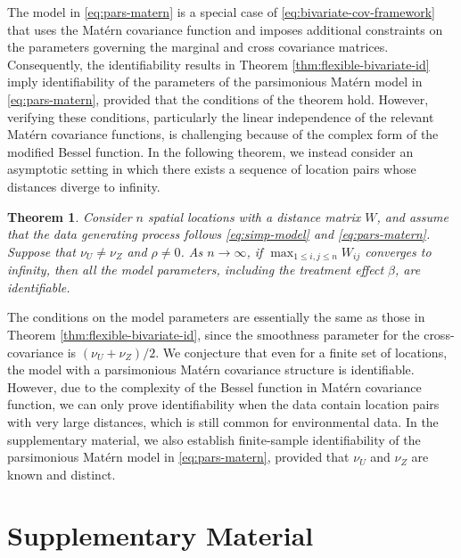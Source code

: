 \documentclass[11pt]{article}
\newtheorem{theorem}{Theorem}
\theoremstyle{definition}
\theoremstyle{remark}
\begin{document}
The model in \eqref{eq:pars-matern} is a special case of \eqref{eq:bivariate-cov-framework} that uses the Matérn covariance function and imposes additional constraints on the parameters governing the marginal and cross covariance matrices.
Consequently, the identifiability results in Theorem \ref{thm:flexible-bivariate-id} imply identifiability of the parameters of the parsimonious Matérn model in \eqref{eq:pars-matern}, provided that the conditions of the theorem hold.
However, verifying these conditions, particularly the linear independence of the relevant Matérn covariance functions, is challenging because of the complex form of the modified Bessel function. 
In the following theorem, 
we instead consider an asymptotic setting in which there exists a sequence of location pairs whose distances diverge to infinity.



\begin{theorem}\label{thm:bivariate-matern-id-full-asymptotic}
Consider $n$ spatial locations with a distance matrix $W$, and assume that the data generating process follows \eqref{eq:simp-model} and \eqref{eq:pars-matern}.
Suppose that $\nu_U \neq \nu_Z$ and $\rho\neq 0$. 
As $n\rightarrow \infty$, 
if $\max_{1\le i, j \le n} W_{ij}$ converges to infinity, then all the model parameters, including the treatment effect $\beta$, 
are identifiable. 
\end{theorem}

The conditions on the model parameters are essentially the same as those in Theorem \ref{thm:flexible-bivariate-id}, since the smoothness parameter for the cross-covariance is $(\nu_U+\nu_Z)/2$. 
We conjecture that even for a finite set of locations, the model with a parsimonious Mat\'ern covariance structure is identifiable. However, due to the complexity of the Bessel function in Mat\'ern covariance function, we can only prove identifiability when the data contain location pairs with very large distances, which is still common for environmental data.
In the supplementary material, we also establish finite-sample identifiability of the parsimonious Matérn model in \eqref{eq:pars-matern}, provided that $\nu_U$ and $\nu_Z$ are known and distinct.


\appendix
\section*{Supplementary Material}

\renewcommand{\thesection}{A\arabic{section}}
\renewcommand{\thetheorem}{A\arabic{theorem}}
\renewcommand{\thelemma}{A\arabic{lemma}}
\renewcommand{\theproposition}{A\arabic{proposition}}
\renewcommand{\thecorollary}{A\arabic{corollary}}
\renewcommand{\theequation}{A\arabic{equation}}
\renewcommand{\thefigure}{A\arabic{figure}}
\renewcommand{\thetable}{A\arabic{table}}
\renewcommand{\theremark}{A\arabic{remark}}
\end{document}

